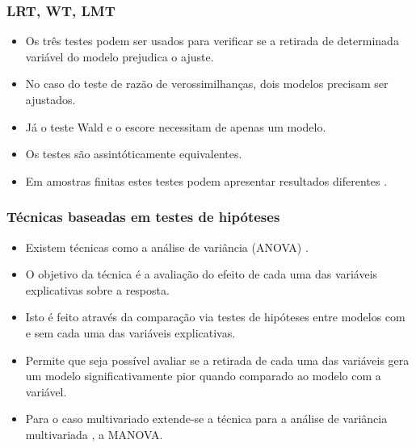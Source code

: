 \documentclass[handout,serif, professionalfont, usenames, dvipsnames, aspectratio = 169]{beamer}\usepackage[]{graphicx}\usepackage[]{color}
\begin{document}
\begin{frame}
  \frametitle{LRT, WT, LMT}

  \begin{itemize}
    \itemsep 2ex

  \item Os três testes podem ser usados para verificar se a retirada de determinada variável do modelo prejudica o ajuste. 
  
  \item No caso do teste de razão de verossimilhanças, dois modelos precisam ser ajustados. 

  \item Já o teste Wald e o escore necessitam de apenas um modelo. 

  \item Os testes são assintóticamente equivalentes. 

  \item Em amostras finitas estes testes podem apresentar resultados diferentes \cite{conflict}.

  \end{itemize}

\end{frame}


\begin{frame}
  \frametitle{Técnicas baseadas em testes de hipóteses}

  \begin{itemize}
    \itemsep 2ex

  \item Existem técnicas como a análise de variância (ANOVA) \cite{anova_fisher}. 
  
  \item O objetivo da técnica é a avaliação do efeito de cada uma das variáveis explicativas sobre a resposta. 

  \item Isto é feito através da comparação via testes de hipóteses entre modelos com e sem cada uma das variáveis explicativas.

  \item Permite que seja possível avaliar se a retirada de cada uma das variáveis gera um modelo significativamente pior quando comparado ao modelo com a variável. 

  \item Para o caso multivariado extende-se a técnica para a análise de variância multivariada \cite{manova}, a MANOVA. 

  \end{itemize}

\end{frame}
\end{document}
